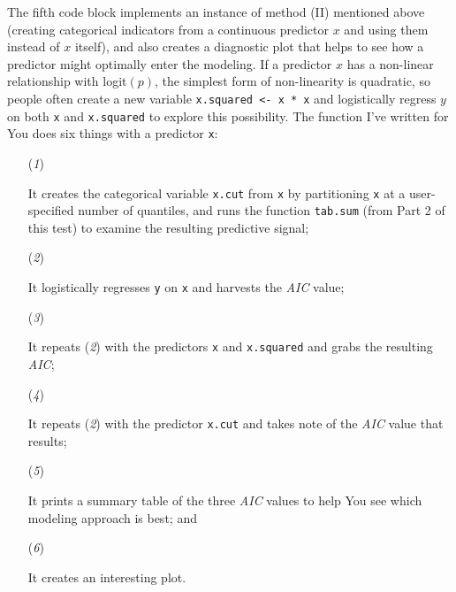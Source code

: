 \documentclass[12pt]{article}
\begin{document}
The fifth code block implements an instance of method (II) mentioned above (creating categorical indicators from a continuous predictor $x$ and using them instead of $x$ itself), and also creates a diagnostic plot that helps to see how a predictor might optimally enter the modeling. If a predictor $x$ has a non-linear relationship with logit$( p )$, the simplest form of non-linearity is quadratic, so people often create a new variable \texttt{x.squared <- x * x} and logistically regress $y$ on both \texttt{x} and \texttt{x.squared} to explore this possibility. The function I've written for You does six things with a predictor \texttt{x}: 

\begin{itemize}

\item[(\textit{1})]

It creates the categorical variable \texttt{x.cut} from \texttt{x} by partitioning \texttt{x} at a user-specified number of quantiles, and runs the function \texttt{tab.sum} (from Part 2 of this test) to examine the resulting predictive signal; 

\item[(\textit{2})]

It logistically regresses \texttt{y} on \texttt{x} and harvests the \textit{AIC} value; 

\item[(\textit{3})]

It repeats (\textit{2}) with the predictors \texttt{x} and \texttt{x.squared} and grabs the resulting \textit{AIC}; 

\item[(\textit{4})]

It repeats (\textit{2}) with the predictor \texttt{x.cut} and takes note of the \textit{AIC} value that results; 

\item[(\textit{5})]

It prints a summary table of the three \textit{AIC} values to help You see which modeling approach is best; and 

\item[(\textit{6})] 

It creates an interesting plot. 

\end{itemize}
\end{document}
